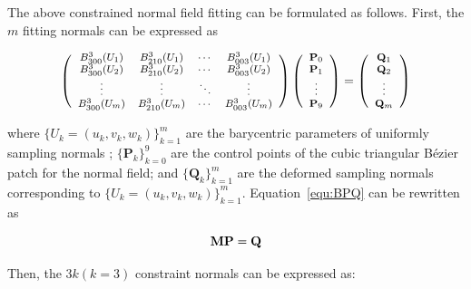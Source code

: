 \documentclass[3p]{elsarticle}
\begin{document}
The above constrained normal field fitting can be formulated as follows. First, the $m$ fitting normals can be expressed as

\begin{equation}
	\footnotesize
		\left(
		\begin{array}{cccc}
		B^3_{300}(U_1) & B^3_{210}(U_1) & \cdots & B^3_{003}(U_1) \\
		B^3_{300}(U_2) & B^3_{210}(U_2) & \cdots & B^3_{003}(U_2) \\
		\vdots & \vdots & \ddots & \vdots \\
		B^3_{300}(U_m) & B^3_{210}(U_m) & \cdots & B^3_{003}(U_m) \\
		\end{array}
		\right)
		\left(
		\begin{array}{c}
		\mathbf P_0 \\
		\mathbf P_1 \\
		\vdots \\
		\mathbf P_9
		\end{array}
		\right)
		=
		\left(
		\begin{array}{c}
		\mathbf Q_1 \\
		\mathbf Q_2 \\
		\vdots \\
		\mathbf Q_m
		\end{array}
		\right)
	\label{equ:BPQ}
\end{equation}

\noindent where $\{U_k=(u_k,v_k,w_k)\}^m_{k=1}$ are the barycentric parameters of uniformly sampling normals ;
$\{\mathbf P_k\}_{k=0}^9$ are the control points of the cubic triangular B\'ezier patch for the normal field; and
$\{\mathbf Q_k\}_{k=1}^m$ are the deformed sampling normals corresponding to $\{U_k=(u_k,v_k,w_k)\}^m_{k=1}$.
Equation~\ref{equ:BPQ} can be rewritten as

\begin{equation}
	\footnotesize
	\mathbf M \mathbf P=\mathbf Q
\end{equation}

Then, the $3k(k=3)$ constraint normals can be expressed as:
\end{document}
